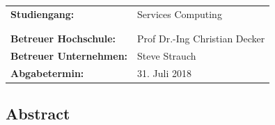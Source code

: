 \documentclass[paper=a4,       %
					 11pt,
					 BCOR0mm,  %
					 DIV10,    %
					 automark, %
					 twoside,
					 halfparskip,
					 bibtotoc,
					 headsepline,
					 normalheadings,
					 appendixprefix,
					 pagesize  %
 ]{scrbook}
\begin{document}
\begin{titlepage}
\begin{sffamily}
\begin{center}
\begin{minipage}{3cm}
\begin{center}
\end{center}
\end{minipage}
\begin{minipage}{3cm}
\begin{center}
\end{center}
\end{minipage}
\end{center}
%
\vspace{1.0cm}
%
\begin{center}
\begin{tabular}{ll}
\textbf{Studiengang:} & Services Computing\\
&\\&\\
\textbf{Betreuer Hochschule:}   & Prof Dr.-Ing Christian Decker\\
\textbf{Betreuer Unternehmen:}   & Steve Strauch\\
                     
\textbf{Abgabetermin:} &   31. Juli 2018\\

\end{tabular}
\end{center}
\end{sffamily}
\end{titlepage}
\restoregeometry
\cleardoubleemptypage

\setlength{\parindent}{0.0em}


\begin{center}
\section*{Abstract}
\end{center}
\pagestyle{empty}
\end{document}
